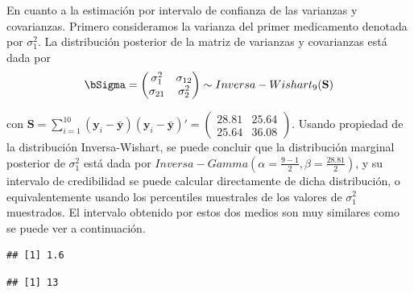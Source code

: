 \begin{Eje}
En cuanto a la estimación por intervalo de confianza de las varianzas y covarianzas. Primero consideramos la varianza del primer medicamento denotada por $\sigma^2_1$. La distribución posterior de la matriz de varianzas y covarianzas está dada por
\begin{equation*}
\bSigma=\begin{pmatrix}\sigma^2_1&\sigma_{12}\\\sigma_{21}&\sigma^2_{2} \end{pmatrix}\sim Inversa-Wishart_9(\mathbf{S})
\end{equation*}

con $\mathbf{S}=\sum_{i=1}^{10}(\mathbf{y}_i-\bar{\mathbf{y}})(\mathbf{y}_i-\bar{\mathbf{y}})'=\begin{pmatrix}28.81&25.64\\25.64&36.08\end{pmatrix}$. Usando propiedad de la distribución Inversa-Wishart, se puede concluir que la distribución marginal posterior de $\sigma^2_1$ está dada por $Inversa-Gamma(\alpha=\frac{9-1}{2}, \beta=\frac{28.81}{2})$, y su intervalo de credibilidad se puede calcular directamente de dicha distribución, o equivalentemente usando los percentiles muestrales de los valores de $\sigma^2_1$ muestrados. El intervalo obtenido por estos dos medios son muy similares como se puede ver a continuación.
\begin{knitrout}
\color{fgcolor}\begin{kframe}
\begin{alltt}
\hlstd{(}\hlstd{,} \hlstd{=}\hlopt{/}\hlstd{,} \hlstd{=}\hlopt{/}\hlstd{)}
\end{alltt}
\begin{verbatim}
## [1] 1.6
\end{verbatim}
\begin{alltt}
\hlstd{(}\hlstd{,} \hlstd{=}\hlopt{/}\hlstd{,} \hlstd{=}\hlopt{/}\hlstd{)}
\end{alltt}
\begin{verbatim}
## [1] 13
\end{verbatim}
\begin{alltt}
\hlstd{(Sigma.pos[,}\hlstd{,}\hlstd{],} \hlstd{(}\hlstd{,} \hlstd{))}
\end{alltt}

\end{kframe}
\end{knitrout}
\end{Eje}
